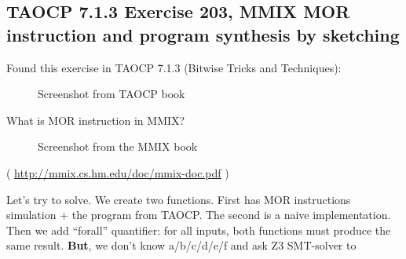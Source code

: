 \subsection{TAOCP 7.1.3 Exercise 203, MMIX MOR instruction and program synthesis by sketching}

Found this exercise in TAOCP 7.1.3 (Bitwise Tricks and Techniques):

\begin{figure}[H]
\centering
{}
\caption{Screenshot from TAOCP book}
\end{figure}

What is MOR instruction in MMIX?

\begin{figure}[H]
\centering
{}
\caption{Screenshot from the MMIX book}
\end{figure}

( \url{http://mmix.cs.hm.edu/doc/mmix-doc.pdf} )

Let's try to solve. We create two functions. First has MOR instructions simulation + the program from TAOCP.
The second is a naive implementation.
Then we add ``forall'' quantifier: for all inputs, both functions must produce the same result.
\textbf{But}, we don't know a/b/c/d/e/f and ask Z3 SMT-solver to

